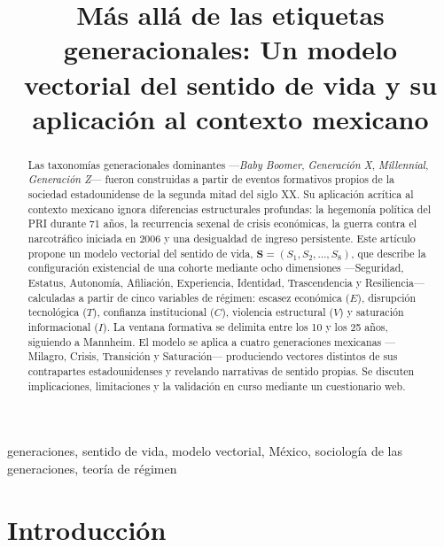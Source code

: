 \documentclass[conference,spanish]{IEEEtran}
\begin{document}
\title{Más allá de las etiquetas generacionales: Un modelo vectorial del sentido de vida y su aplicación al contexto mexicano}

\author{
}

\maketitle

\begin{abstract}
Las taxonomías generacionales dominantes ---\textit{Baby Boomer}, \textit{Generación X}, \textit{Millennial}, \textit{Generación Z}--- fueron construidas a partir de eventos formativos propios de la sociedad estadounidense de la segunda mitad del siglo XX. Su aplicación acrítica al contexto mexicano ignora diferencias estructurales profundas: la hegemonía política del PRI durante 71 años, la recurrencia sexenal de crisis económicas, la guerra contra el narcotráfico iniciada en 2006 y una desigualdad de ingreso persistente. Este artículo propone un modelo vectorial del sentido de vida, $\mathbf{S} = (S_1, S_2, \ldots, S_8)$, que describe la configuración existencial de una cohorte mediante ocho dimensiones ---Seguridad, Estatus, Autonomía, Afiliación, Experiencia, Identidad, Trascendencia y Resiliencia--- calculadas a partir de cinco variables de régimen: escasez económica ($E$), disrupción tecnológica ($T$), confianza institucional ($C$), violencia estructural ($V$) y saturación informacional ($I$). La ventana formativa se delimita entre los 10 y los 25 años, siguiendo a Mannheim. El modelo se aplica a cuatro generaciones mexicanas ---Milagro, Crisis, Transición y Saturación--- produciendo vectores distintos de sus contrapartes estadounidenses y revelando narrativas de sentido propias. Se discuten implicaciones, limitaciones y la validación en curso mediante un cuestionario web.
\end{abstract}

\begin{IEEEkeywords}
generaciones, sentido de vida, modelo vectorial, México, sociología de las generaciones, teoría de régimen
\end{IEEEkeywords}

\section{Introducción}
\end{document}
